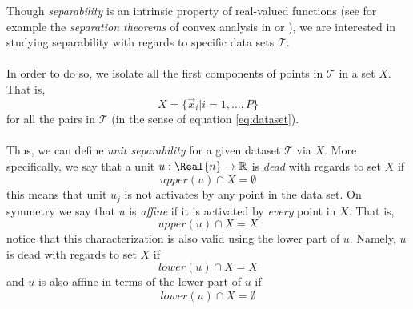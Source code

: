 Though \emph{separability} is an intrinsic property of real-valued functions (see for example the \emph{separation theorems} of convex analysis in \cite{florenzano2001ConvexAnalysis}  or \cite{Burges1998TutorialOnSVMForPatternRecognition}), we are interested in studying separability with regards to specific data sets $\mathcal{T}$. 
\\\\
In order to do so, we isolate all the first components of points in $\mathcal{T}$ in a set $X$. That is, 
\begin{equation}
    X = \{\vec{x}_i|i=1,\ldots,P\}
\end{equation}
for all the pairs in $\mathcal{T}$ (in the sense of equation \ref{eq:dataset}). 
\\\\
Thus, we can define \emph{unit separability} for a given dataset $\mathcal{T}$ via $X$. More specifically, we say that a unit $u:\Real{n}\rightarrow\mathbb{R}$ is \emph{dead} with regards to set $X$ if
\begin{equation}\label{eq:deadUnitVersion1}
 upper(u)\cap X = \emptyset 
\end{equation}
this means that unit $u_j$ is not activates by any point in the data set. On symmetry  we say that $u$ is \emph{affine} if it is activated by \emph{every} point in $X$. That is, 
\begin{equation}\label{eq:affineUnit}
 upper(u)\cap X = X
\end{equation}
notice that this characterization is also valid using the lower part of $u$. Namely, $u$ is dead with regards to set $X$ if
\begin{equation}\label{eq:deadNeuronVersion2}
    lower(u)\cap X = X
\end{equation}
and $u$ is also affine in terms of the lower part of $u$ if 
\begin{equation}
    lower(u)\cap X = \emptyset
\end{equation}


